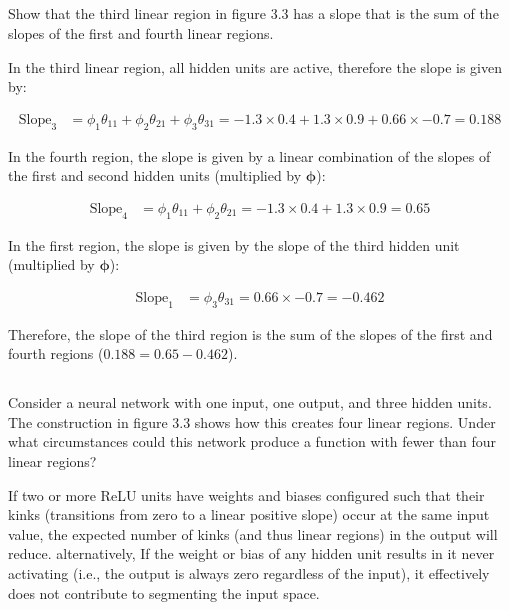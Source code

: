\documentclass[12pt]{report}
\begin{document}
\subsection{}
\begin{mdframed}
    Show that the third linear region in figure 3.3 has a slope that is the sum of the slopes of the first and fourth linear regions.
\end{mdframed}

In the third linear region, all hidden units are active, therefore the slope is given by:

\begin{align*}
    \text{Slope}_{3} & = \phi_{1}\theta_{11} + \phi_{2}\theta_{21} + \phi_{3}\theta_{31} = -1.3 \times 0.4 + 1.3 \times 0.9 + 0.66 \times -0.7 = 0.188
\end{align*}

In the fourth region, the slope is given by a linear combination of the slopes of the first and second hidden units (multiplied by $\boldsymbol{\phi}$):

\begin{align*}
    \text{Slope}_{4} & = \phi_{1}\theta_{11} + \phi_{2}\theta_{21} = -1.3 \times 0.4 + 1.3 \times 0.9 = 0.65
\end{align*}

In the first region, the slope is given by the slope of the third hidden unit (multiplied by $\boldsymbol{\phi}$):

\begin{align*}
    \text{Slope}_{1} & = \phi_{3}\theta_{31} = 0.66 \times -0.7 = -0.462
\end{align*}

Therefore, the slope of the third region is the sum of the slopes of the first and fourth regions ($0.188 = 0.65 - 0.462$).

\subsection{}
\begin{mdframed}
    Consider a neural network with one input, one output, and three hidden units. The construction in figure 3.3 shows how this creates four linear regions. Under what circumstances could this network produce a function with fewer than four linear regions?
\end{mdframed}

If two or more ReLU units have weights and biases configured such that their kinks (transitions from zero to a linear positive slope) occur at the same input value, the expected number of kinks (and thus linear regions) in the output will reduce. alternatively, If the weight or bias of any hidden unit results in it never activating (i.e., the output is always zero regardless of the input), it effectively does not contribute to segmenting the input space.
\end{document}
